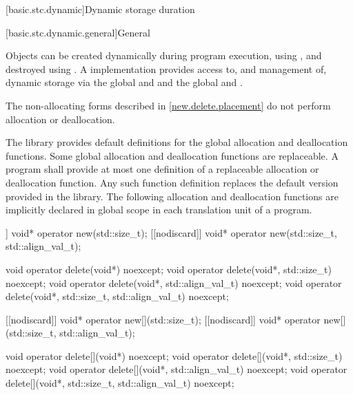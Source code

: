 [basic.stc.dynamic]{Dynamic storage duration}%

[basic.stc.dynamic.general]{General}%

\pnum
Objects can be created dynamically during program
execution, using
%
, and destroyed using
%
. A \Cpp{} implementation
provides access to, and management of, dynamic storage via the global
  and  and the global   and .
\begin{note}
The non-allocating forms described in \ref{new.delete.placement}
do not perform allocation or deallocation.
\end{note}

\pnum
The library provides default definitions for the global allocation and
deallocation functions. Some global allocation and deallocation
functions are replaceable. A \Cpp{} program shall
provide at most one definition of a replaceable allocation or
deallocation function. Any such function definition replaces the default
version provided in the library. The
following allocation and deallocation functions
are implicitly declared in global scope in each translation unit of a
program.

\begin{codeblock}
[[nodiscard]] void* operator new(std::size_t);
[[nodiscard]] void* operator new(std::size_t, std::align_val_t);

void operator delete(void*) noexcept;
void operator delete(void*, std::size_t) noexcept;
void operator delete(void*, std::align_val_t) noexcept;
void operator delete(void*, std::size_t, std::align_val_t) noexcept;

[[nodiscard]] void* operator new[](std::size_t);
[[nodiscard]] void* operator new[](std::size_t, std::align_val_t);

void operator delete[](void*) noexcept;
void operator delete[](void*, std::size_t) noexcept;
void operator delete[](void*, std::align_val_t) noexcept;
void operator delete[](void*, std::size_t, std::align_val_t) noexcept;
\end{codeblock}

